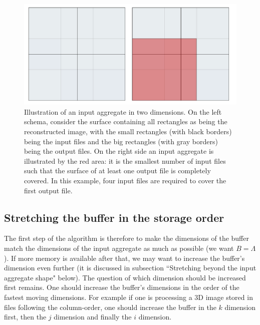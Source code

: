 \documentclass[conference]{IEEEtran}
\begin{document}
\begin{figure}[h]
\centering
\includegraphics[scale=0.15]{./figures/input_aggregates.png}
\caption{Illustration of an input aggregate in two dimensions. On the left schema, consider the surface containing all rectangles as being the reconstructed image, with the small rectangles (with black borders) being the input files and the big rectangles (with gray borders) being the output files. On the right side an input aggregate is illustrated by the red area: it is the smallest number of input files such that the surface of at least one output file is completely covered. In this example, four input files are required to cover the first output file.
}
\label{fig:input_aggregates}
\end{figure}


\subsection{Stretching the buffer in the storage order}
The first step of the algorithm is therefore to make the dimensions of the buffer match the dimensions of the input aggregate as much as possible (we want $B=\Lambda$).
If more memory is available after that, we may want to increase the buffer's dimension even further (it is discussed in subsection ``Stretching beyond the input aggregate shape" below).
The question of which dimension should be increased first remains.
One should increase the buffer's dimensions in the order of the fastest moving dimensions.
For example if one is processing a 3D image stored in files following the column-order, one should increase the buffer in the $k$ dimension first, then the $j$ dimension and finally the $i$ dimension. \\
\end{document}

